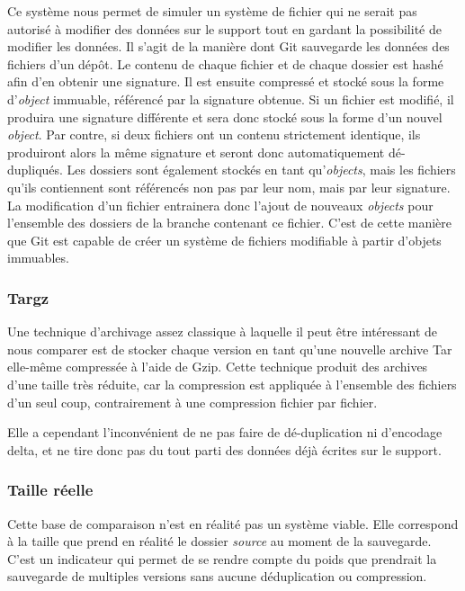 \documentclass[a4paper]{article}
\begin{document}
Ce système nous permet de simuler un système de fichier qui ne serait
pas autorisé à modifier des données sur le support tout en gardant la
possibilité de modifier les données. Il s'agit de la manière dont Git
sauvegarde les données des fichiers d'un dépôt. Le contenu de chaque
fichier et de chaque dossier est hashé afin d'en obtenir une signature.
Il est ensuite compressé et stocké sous la forme d'\emph{object}
immuable, référencé par la signature obtenue. Si un fichier est modifié,
il produira une signature différente et sera donc stocké sous la forme
d'un nouvel \emph{object}. Par contre, si deux fichiers ont un contenu
strictement identique, ils produiront alors la même signature et seront
donc automatiquement dé-dupliqués. Les dossiers sont également stockés
en tant qu'\emph{objects}, mais les fichiers qu'ils contiennent sont
référencés non pas par leur nom, mais par leur signature. La
modification d'un fichier entrainera donc l'ajout de nouveaux
\emph{objects} pour l'ensemble des dossiers de la branche contenant ce
fichier. C'est de cette manière que Git est capable de créer un système
de fichiers modifiable à partir d'objets immuables.

\subsubsection{Targz}

Une technique d'archivage assez classique à laquelle il peut être
intéressant de nous comparer est de stocker chaque version en tant
qu'une nouvelle archive Tar elle-même compressée à l'aide de Gzip. Cette
technique produit des archives d'une taille très réduite, car la
compression est appliquée à l'ensemble des fichiers d'un seul coup,
contrairement à une compression fichier par fichier.

Elle a cependant l'inconvénient de ne pas faire de dé-duplication ni
d'encodage delta, et ne tire donc pas du tout parti des données déjà
écrites sur le support.

\subsubsection{Taille réelle}

Cette base de comparaison n'est en réalité pas un système viable. Elle
correspond à la taille que prend en réalité le dossier \emph{source} au
moment de la sauvegarde. C'est un indicateur qui permet de se rendre
compte du poids que prendrait la sauvegarde de multiples versions sans
aucune déduplication ou compression.
\end{document}
